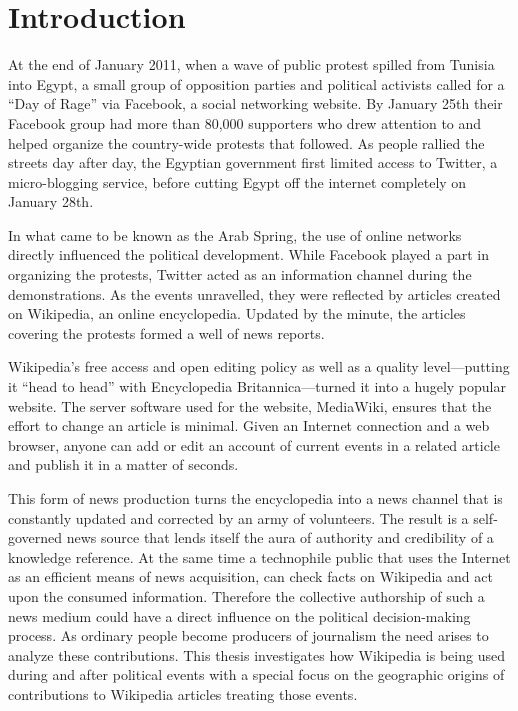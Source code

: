 \chapter{Introduction}\label{ch:introduction}


At the end of January 2011, when a wave of public protest spilled from Tunisia into Egypt, a small group of opposition parties and political activists called for a ``Day of Rage'' via Facebook, a social networking website.
By January 25th their Facebook group had more than 80,000 supporters who drew attention to and helped organize the country-wide protests that followed. 
As people rallied the streets day after day, the Egyptian government first limited access to Twitter, a micro-blogging service, before cutting Egypt off the internet completely on January 28th.\cite{econ18013760, szegypt}

In what came to be known as the Arab Spring, the use of online networks directly influenced the political development.
While Facebook played a part in organizing the protests, Twitter acted as an information channel during the demonstrations.
As the events unravelled, they were reflected by articles created on Wikipedia, an online encyclopedia.
Updated by the minute, the articles covering the protests formed a well of news reports.\cite{wikiegypt}

Wikipedia's free access and open editing policy as well as a quality level---putting it ``head to head''\cite{giles2005internet} with Encyclopedia Britannica---turned it into a hugely popular website\cite{wikipv}.
The server software used for the website, MediaWiki, ensures that the effort to change an article is minimal.
Given an Internet connection and a web browser, anyone can add or edit an account of current events in a related article and publish it in a matter of seconds.

This form of news production turns the encyclopedia into a news channel that is constantly updated and corrected by an army of volunteers.
The result is a self-governed news source that lends itself the aura of authority and credibility of a knowledge reference.
At the same time a technophile public that uses the Internet as an efficient means of news acquisition, can check facts on Wikipedia and act upon the consumed information.\cite[p. 424--427]{chadwick2009routledge}
Therefore the collective authorship of such a news medium could have a direct influence on the political decision-making process.
As ordinary people become producers of journalism the need arises to analyze these contributions. 
This thesis investigates  how Wikipedia is being used during and after political events with a special focus on the geographic origins of contributions to Wikipedia articles treating those events.

